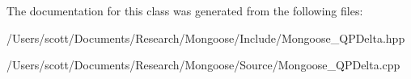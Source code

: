 The documentation for this class was generated from the following files\+:\begin{DoxyCompactItemize}
\item 
/\+Users/scott/\+Documents/\+Research/\+Mongoose/\+Include/Mongoose\+\_\+\+Q\+P\+Delta.\+hpp\item 
/\+Users/scott/\+Documents/\+Research/\+Mongoose/\+Source/Mongoose\+\_\+\+Q\+P\+Delta.\+cpp\end{DoxyCompactItemize}
